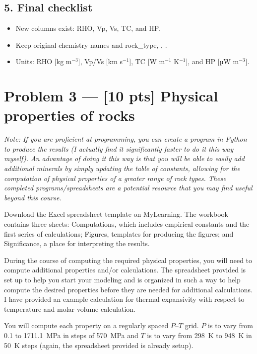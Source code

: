 \documentclass[11pt,a4paper]{article}
\begin{document}
\subsection*{5.\; Final checklist}
\begin{itemize}[leftmargin=*]
  \item New columns exist: RHO, Vp, Vs, TC, and HP.
  \item Keep original chemistry names and rock\_type, , .
  \item Units: RHO [kg m$^{-3}$], Vp/Vs [km s$^{-1}$], TC [W m$^{-1}$ K$^{-1}$], and HP [µW m$^{-3}$].
\end{itemize}

\section*{Problem 3 --- [10 pts] Physical properties of rocks}\label{itm:physprop}

{\it Note: If you are proficient at programming, you can create a program in Python to produce the results (I actually find it significantly faster to do it this way myself).  An advantage of doing it this way is that you will be able to easily add additional minerals by simply updating the table of constants, allowing for the computation of physical properties of a greater range of rock types.  These completed programs/spreadsheets are a potential resource that you may find useful beyond this course.}

Download the Excel spreadsheet template on MyLearning.  The workbook contains three sheets: Computations, which includes empirical constants and the first series of calculations; Figures, templates for producing the figures; and Significance, a place for interpreting the results.

During the course of computing the required physical properties, you will need to compute additional properties and/or calculations.  The spreadsheet provided is set up to help you start your modeling and is organized in such a way to help compute the desired properties before they are needed for additional calculations.  I have provided an example calculation for thermal expansivity with respect to temperature and molar volume calculation.

You will compute each property on a regularly spaced $P$--$T$ grid. $P$ is to vary from 0.1 to 1711.1~MPa in steps of 570~MPa and $T$ is to vary from 298~K to 948~K in 50~K steps (again, the spreadsheet provided is already setup).
\end{document}
